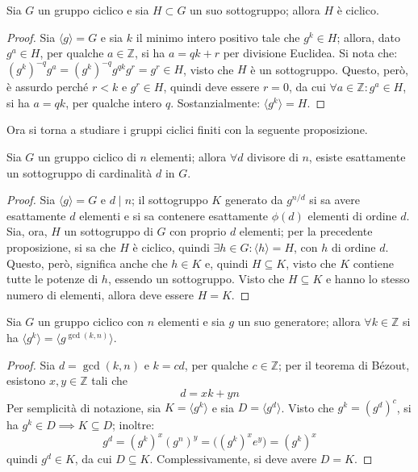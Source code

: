 \documentclass[11pt, a4paper]{scrartcl}
\theoremstyle{definition}
\numberwithin{esempio}{section}
\theoremstyle{definition}
\numberwithin{obs}{section}
\numberwithin{nota}{section}
\numberwithin{equation}{subsection}
\begin{document}
\begin{prop}
	{}{}
	Sia $G$ un gruppo ciclico e sia $H \subset G$ un suo sottogruppo; allora $H$ \`e ciclico.
	\begin{proof}
		Sia $\langle g \rangle= G$ e sia $k$ il minimo intero positivo tale che $g^k \in H$; allora, dato $g^a \in H$, per qualche $a \in \mathbb{Z}$, si ha $a = qk + r$ per divisione Euclidea.
Si nota che: $(g^k)^{-q} g^a = (g^k)^{-q} g^{qk} g^r=g^r \in H$, visto che $H$ \`e un sottogruppo.
Questo, per\`o, \`e assurdo perch\'e $r < k$ e $g^r \in H$, quindi deve essere $r = 0$, da cui $\forall a \in \mathbb{Z} : g^a\in H$, si ha $a = qk$, per qualche intero $q$.
Sostanzialmente: $\langle g^k \rangle = H$.
	\end{proof}
\end{prop}
Ora si torna a studiare i gruppi ciclici finiti con la seguente proposizione.
\begin{prop}
	{}{}
	Sia $G$ un gruppo ciclico di $n$ elementi; allora $\forall d$ divisore di $n$, esiste esattamente un sottogruppo di cardinalit\`a $d$ in $G$.
	\begin{proof}
		Sia $\langle g \rangle= G$ e $d \mid n$; il sottogruppo $K$ generato da $g^{n / d} $ si sa avere esattamente $d$ elementi e si sa contenere esattamente $\phi (d)$ elementi di ordine $d$.
		Sia, ora, $H $ un sottogruppo di $G$ con proprio $d$ elementi; per la precedente proposizione, si sa che $H$ \`e ciclico, quindi $\exists h \in G : \langle h \rangle=H$, con $h$ di ordine $d$.
		Questo, per\`o, significa anche che $h \in K$ e, quindi $H \subseteq K$, visto che $K$ contiene tutte le potenze di $h$, essendo un sottogruppo.
		Visto che $H \subseteq K$ e hanno lo stesso numero di elementi, allora deve essere $H = K$.
	\end{proof}
\end{prop}
\begin{prop}
	{}{}
	Sia $G$ un gruppo ciclico con $n $ elementi e sia $g$ un suo generatore; allora $\forall k \in \mathbb{Z}$ si ha $\langle g^k \rangle= \langle g^{\operatorname{gcd}(k,n) }  \rangle$.
	\begin{proof}
		Sia $d = \operatorname{gcd}(k,n) $ e $k = cd$, per qualche $c \in \mathbb{Z}$; per il teorema di B\'ezout, esistono $x,y \in \mathbb{Z}$ tali che
		\[
		d = xk + yn
		\] 
		Per semplicit\`a di notazione, sia $K = \langle g^k \rangle$ e sia $D = \langle g^d \rangle$.
		Visto che $g^k=(g^d)^c$, si ha $g^k \in D\implies K \subseteq D$; inoltre:
		\[
		g^d = (g^k)^x (g^n)^y = \big((g^k)^xe^y\big)=(g^k)^x
		\] 
		quindi $g^d \in K$, da cui $D \subseteq K$.
		Complessivamente, si deve avere $D = K$.
	\end{proof}
\end{prop}
\end{document}
